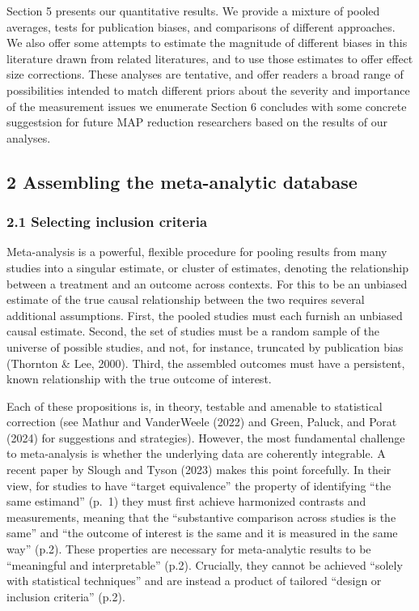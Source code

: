 \documentclass[
  man]{apa6}
\begin{document}
Section 5 presents our quantitative results. We provide a mixture of pooled averages, tests for publication biases, and comparisons of different approaches. We also offer some attempts to estimate the magnitude of different biases in this literature drawn from related literatures, and to use those estimates to offer effect size corrections. These analyses are tentative, and offer readers a broad range of possibilities intended to match different priors about the severity and importance of the measurement issues we enumerate Section 6 concludes with some concrete suggestsion for future MAP reduction researchers based on the results of our analyses.

\subsection{2 Assembling the meta-analytic database}\label{assembling-the-meta-analytic-database}

\subsubsection{2.1 Selecting inclusion criteria}\label{selecting-inclusion-criteria}

Meta-analysis is a powerful, flexible procedure for pooling results from many studies into a singular estimate, or cluster of estimates, denoting the relationship between a treatment and an outcome across contexts. For this to be an unbiased estimate of the true causal relationship between the two requires several additional assumptions. First, the pooled studies must each furnish an unbiased causal estimate. Second, the set of studies must be a random sample of the universe of possible studies, and not, for instance, truncated by publication bias (Thornton \& Lee, 2000). Third, the assembled outcomes must have a persistent, known relationship with the true outcome of interest.

Each of these propositions is, in theory, testable and amenable to statistical correction (see Mathur and VanderWeele (2022) and Green, Paluck, and Porat (2024) for suggestions and strategies). However, the most fundamental challenge to meta-analysis is whether the underlying data are coherently integrable. A recent paper by Slough and Tyson (2023) makes this point forcefully. In their view, for studies to have ``target equivalence'' \textemdash the property of identifying ``the same estimand'' (p.~1) \textemdash they must first achieve harmonized contrasts and measurements, meaning that the ``substantive comparison across studies is the same'' and ``the outcome of interest is the same and it is measured in the same way'' (p.2). These properties are necessary for meta-analytic results to be ``meaningful and interpretable'' (p.2). Crucially, they cannot be achieved ``solely with statistical techniques'' and are instead a product of tailored ``design or inclusion criteria'' (p.2).
\end{document}
